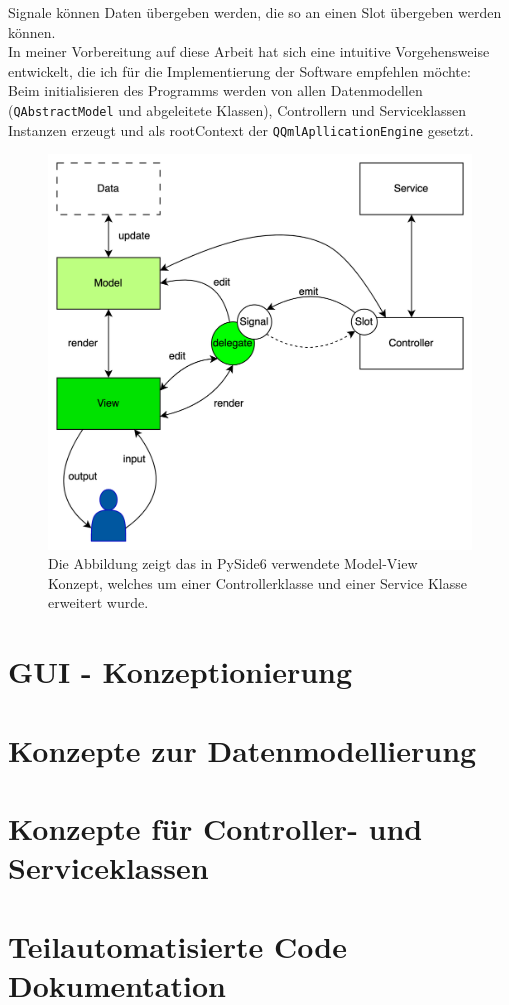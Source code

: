 Signale können Daten übergeben werden, die so an einen Slot übergeben werden können.\\
\vspace{1cm}
In meiner Vorbereitung auf diese Arbeit hat sich eine intuitive Vorgehensweise entwickelt, die ich für die Implementierung
der Software empfehlen möchte:\\
\vspace{1cm}
Beim initialisieren des Programms werden von allen Datenmodellen (\verb|QAbstractModel| und abgeleitete Klassen), Controllern
und Serviceklassen Instanzen erzeugt und als rootContext der \verb|QQmlApllicationEngine| gesetzt.
\lstset{
    basicstyle=\small\ttfamily
}
\label{exampleApp}
\begin{figure}
        \caption[Model-View Konzept mit zusätzlichem Controller und Service ]
        {\small Die Abbildung zeigt das in PySide6 verwendete Model-View Konzept, welches um einer Controllerklasse und
        einer Service Klasse erweitert wurde. }\label{fig:figure10}
        \includegraphics[width = \textwidth ]{Bilder/MVCS_Beispiel}
        \centering
\end{figure}

\section{GUI - Konzeptionierung}

\section{Konzepte zur Datenmodellierung}

\section{Konzepte für Controller- und Serviceklassen}

\section{Teilautomatisierte Code Dokumentation}